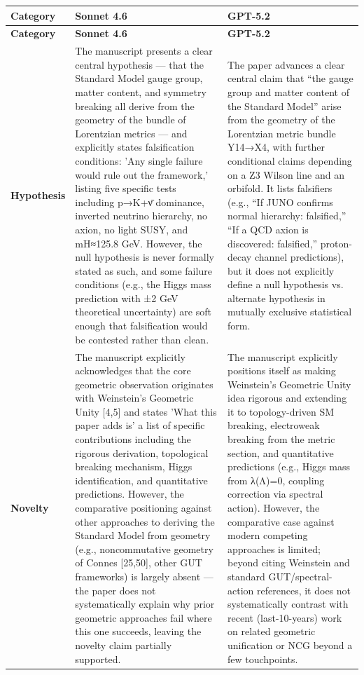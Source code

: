 \documentclass[11pt]{article}
\begin{document}
\begin{longtable}{@{} p{2.2cm} p{6.3cm} p{6.3cm} @{}}
\toprule
\textbf{Category} & \textbf{Sonnet 4.6} & \textbf{GPT-5.2} \\
\midrule
\endfirsthead
\toprule
\textbf{Category} & \textbf{Sonnet 4.6} & \textbf{GPT-5.2} \\
\midrule
\endhead
\bottomrule
\endlastfoot

\rowcolor{rowgray}
\textbf{Hypothesis} &
The manuscript presents a clear central hypothesis — that the Standard Model gauge group, matter content, and symmetry breaking all derive from the geometry of the bundle of Lorentzian metrics — and explicitly states falsification conditions: 'Any single failure would rule out the framework,' listing five specific tests including p→K+ν̄ dominance, inverted neutrino hierarchy, no axion, no light SUSY, and mH≈125.8 GeV. However, the null hypothesis is never formally stated as such, and some failure conditions (e.g., the Higgs mass prediction with ±2 GeV theoretical uncertainty) are soft enough that falsification would be contested rather than clean. &
The paper advances a clear central claim that “the gauge group and matter content of the Standard Model” arise from the geometry of the Lorentzian metric bundle Y14→X4, with further conditional claims depending on a Z3 Wilson line and an orbifold. It lists falsifiers (e.g., “If JUNO confirms normal hierarchy: falsified,” “If a QCD axion is discovered: falsified,” proton-decay channel predictions), but it does not explicitly define a null hypothesis vs. alternate hypothesis in mutually exclusive statistical form. \\[6pt]

\textbf{Novelty} &
The manuscript explicitly acknowledges that the core geometric observation originates with Weinstein's Geometric Unity [4,5] and states 'What this paper adds is' a list of specific contributions including the rigorous derivation, topological breaking mechanism, Higgs identification, and quantitative predictions. However, the comparative positioning against other approaches to deriving the Standard Model from geometry (e.g., noncommutative geometry of Connes [25,50], other GUT frameworks) is largely absent — the paper does not systematically explain why prior geometric approaches fail where this one succeeds, leaving the novelty claim partially supported. &
The manuscript explicitly positions itself as making Weinstein’s Geometric Unity idea rigorous and extending it to topology-driven SM breaking, electroweak breaking from the metric section, and quantitative predictions (e.g., Higgs mass from λ(Λ)=0, coupling correction via spectral action). However, the comparative case against modern competing approaches is limited; beyond citing Weinstein and standard GUT/spectral-action references, it does not systematically contrast with recent (last-10-years) work on related geometric unification or NCG beyond a few touchpoints. \\[6pt]


\end{longtable}
\end{document}
